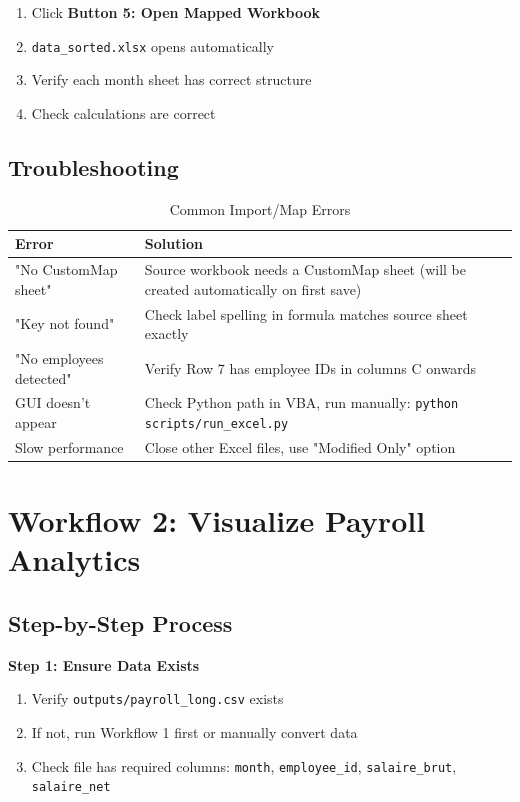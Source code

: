 \begin{enumerate}
    \item Click \textbf{Button 5: Open Mapped Workbook}
    \item \texttt{data\_sorted.xlsx} opens automatically
    \item Verify each month sheet has correct structure
    \item Check calculations are correct
\end{enumerate}

\subsection{Troubleshooting}

\begin{table}[H]
\centering
\footnotesize
\begin{tabularx}{\textwidth}{lX}
\toprule
\textbf{Error} & \textbf{Solution} \\
\midrule
"No CustomMap sheet" & Source workbook needs a CustomMap sheet (will be created automatically on first save) \\
"Key not found" & Check label spelling in formula matches source sheet exactly \\
"No employees detected" & Verify Row 7 has employee IDs in columns C onwards \\
GUI doesn't appear & Check Python path in VBA, run manually: \texttt{python scripts/run\_excel.py} \\
Slow performance & Close other Excel files, use "Modified Only" option \\
\bottomrule
\end{tabularx}
\caption{Common Import/Map Errors}
\end{table}

\section{Workflow 2: Visualize Payroll Analytics}

\subsection{Step-by-Step Process}

\textbf{Step 1: Ensure Data Exists}

\begin{enumerate}
    \item Verify \texttt{outputs/payroll\_long.csv} exists
    \item If not, run Workflow 1 first or manually convert data
    \item Check file has required columns: \texttt{month}, \texttt{employee\_id}, \texttt{salaire\_brut}, \texttt{salaire\_net}
\end{enumerate}

